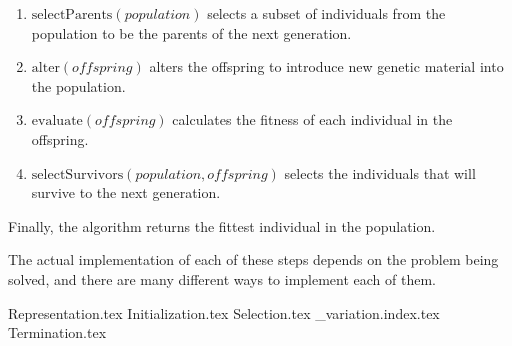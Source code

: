   \begin{enumerate}
    \item \(\mathrm{selectParents}(\mathit{population})\) selects a subset of individuals from the
      population to be the parents of the next generation.
    \item \(\mathrm{alter}(\mathit{offspring})\) alters the offspring to introduce new genetic
      material into the population.
    \item \(\mathrm{evaluate}(\mathit{offspring})\) calculates the fitness of each individual in the
      offspring.
    \item \(\mathrm{selectSurvivors}(\mathit{population}, \mathit{offspring})\) selects the
      individuals that will survive to the next generation.
  \end{enumerate}

  Finally, the algorithm returns the fittest individual in the population.

  The actual implementation of each of these steps depends on the problem being solved, and there
  are many different ways to implement each of them.

  {Representation.tex}
  {Initialization.tex}
  {Selection.tex}
  {_variation.index.tex}
  {Termination.tex}
